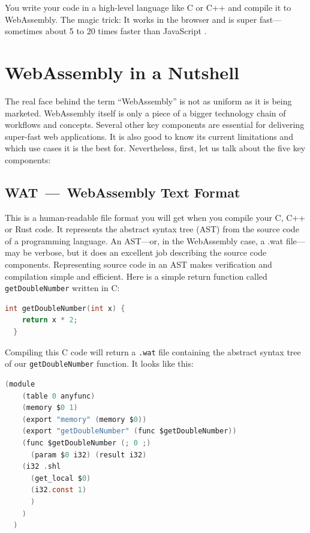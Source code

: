 \documentclass[10pt]{article}
\begin{document}
\begin{sloppypar}
  You write your code in a high-level language like C or C++ and compile it to WebAssembly. The magic trick: It works in the browser and is super fast—sometimes about 5 to 20 times faster than JavaScript \citep{aboukhalil_how_2019}.

  \section{WebAssembly in a Nutshell}
  \label{sec:wasm-in-a-nutshell}

  The real face behind the term “WebAssembly” is not as uniform as it is being marketed. WebAssembly itself is only a piece of a bigger technology chain of workflows and concepts. Several other key components are essential for delivering super-fast web applications. It is also good to know its current limitations and which use cases it is the best for. Nevertheless, first, let us talk about the five key components:

  \subsection{WAT~—~WebAssembly Text Format}
  \label{sec:webassembly-text-format}

  This is a human-readable file format you will get when you compile your C, C++ or Rust code. It represents the abstract syntax tree (AST) from the source code of a programming language. An AST—or, in the WebAssembly case, a .wat file—may be verbose, but it does an excellent job describing the source code components. Representing source code in an AST makes verification and compilation simple and efficient. Here is a simple return function called \lstinline{getDoubleNumber} written in C:

  \vspace{7pt}
  \begin{lstlisting}[language=C, caption=Code example in C., label=lst:c-example]
  int getDoubleNumber(int x) {
    return x * 2;
  }\end{lstlisting}

  Compiling this C code will return a \lstinline{.wat} file containing the abstract syntax tree of our \lstinline{getDoubleNumber} function. It looks like this:

  \vspace{7pt}
  \begin{lstlisting}[language=C, caption=Code example from above compiled into the WebAssembly Text Format., label=lst:wat-example]
  (module
    (table 0 anyfunc)
    (memory $0 1)
    (export "memory" (memory $0))
    (export "getDoubleNumber" (func $getDoubleNumber))
    (func $getDoubleNumber (; 0 ;)
      (param $0 i32) (result i32)
    (i32 .shl
      (get_local $0)
      (i32.const 1)
      )
    )
  )\end{lstlisting}


\end{sloppypar}
\end{document}
